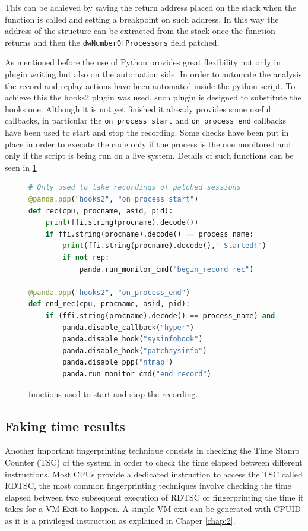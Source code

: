 This can be achieved by saving the return address placed on the stack when the function is called and setting a breakpoint on such address. In this way the address of the structure can be extracted from the stack once the function returns and then the \lstinline{dwNumberOfProcessors} field patched.  


As mentioned before the use of Python provides great flexibility not only in plugin writing but also on the automation side. In order to automate the analysis the record and replay actions have been automated inside the python script. To achieve this the hooks2 plugin was used, such plugin is designed to substitute the hooks one. Although it is not yet finished it already provides some useful callbacks, in particular the \lstinline{on_process_start} and \lstinline{on_process_end} callbacks have been used to start and stop the recording. Some checks have been put in place in order to execute the code only if the process is the one monitored and only if the script is being run on a live system. Details of such functions can be seen in \ref{fig:startstop}

\begin{figure}[htp]
\centering
\begin{lstlisting}[language=Python] 
# Only used to take recordings of patched sessions
@panda.ppp("hooks2", "on_process_start")
def rec(cpu, procname, asid, pid):
    print(ffi.string(procname).decode())
    if ffi.string(procname).decode() == process_name:
        print(ffi.string(procname).decode()," Started!")
        if not rep:
            panda.run_monitor_cmd("begin_record rec")

@panda.ppp("hooks2", "on_process_end")
def end_rec(cpu, procname, asid, pid):
    if (ffi.string(procname).decode() == process_name) and not rep:
        panda.disable_callback("hyper")
        panda.disable_hook("sysinfohook")
        panda.disable_hook("patchsysinfo")
        panda.disable_ppp("ntmap")
        panda.run_monitor_cmd("end_record")
\end{lstlisting}
\caption{functions used to start and stop the recording.}
\label{fig:startstop}
\end{figure}


\subsection{Faking time results}

Another important fingerprinting technique consists in checking the Time Stamp Counter (TSC) of the system in order to check the time elapsed between different instructions. Most CPUs provide a dedicated instruction to access the TSC called RDTSC, the most common fingerprinting techniques involve checking the time elapsed between two subsequent execution of RDTSC or fingerprinting the time it takes for a VM Exit to happen. A simple VM exit can be generated with CPUID as it is a privileged instruction as explained in Chaper \ref{chap:2}.

